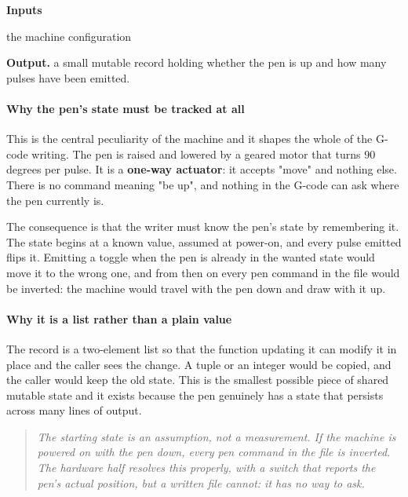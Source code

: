 \noindent\textbf{Inputs}
\begin{description}[leftmargin=2.2em,style=nextline,font=\normalfont\ttfamily]\setlength\itemsep{1pt}
  \item[{cfg}] \normalfont the machine configuration
\end{description}

\noindent\textbf{Output.} a small mutable record holding whether the pen is up and how many pulses have been emitted.


\paragraph{Why the pen's state must be tracked at all}
This is the central peculiarity of the machine and it shapes the whole of the G-code writing. The pen is raised and lowered by a geared motor that turns 90 degrees per pulse. It is a \textbf{one-way actuator}: it accepts "move" and nothing else. There is no command meaning "be up", and nothing in the G-code can ask where the pen currently is.

The consequence is that the writer must know the pen's state by remembering it. The state begins at a known value, assumed at power-on, and every pulse emitted flips it. Emitting a toggle when the pen is already in the wanted state would move it to the wrong one, and from then on every pen command in the file would be inverted: the machine would travel with the pen down and draw with it up.


\paragraph{Why it is a list rather than a plain value}
The record is a two-element list so that the function updating it can modify it in place and the caller sees the change. A tuple or an integer would be copied, and the caller would keep the old state. This is the smallest possible piece of shared mutable state and it exists because the pen genuinely has a state that persists across many lines of output.


\begin{quote}\small\itshape The starting state is an assumption, not a measurement. If the machine is powered on with the pen down, every pen command in the file is inverted. The hardware half resolves this properly, with a switch that reports the pen's actual position, but a written file cannot: it has no way to ask.\end{quote}

